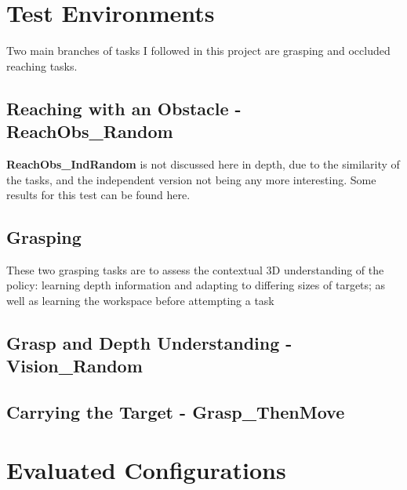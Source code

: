 \section{Test Environments}
Two main branches of tasks I followed in this project are grasping and occluded reaching tasks.

\subsection{Reaching with an Obstacle - \textbf{ReachObs\_Random}}

\textbf{ReachObs\_IndRandom} is not discussed here in depth, due to the similarity of the tasks, and the independent version not being any more interesting. Some results for this test can be found here.

\subsection{Grasping}
These two grasping tasks are to assess the contextual 3D understanding of the policy: learning depth information and adapting to differing sizes of targets; as well as learning the workspace before attempting a task 

\subsection{Grasp and Depth Understanding - \textbf{Vision\_Random}}

\subsection{Carrying the Target - \textbf{Grasp\_ThenMove}}

\section{Evaluated Configurations}
